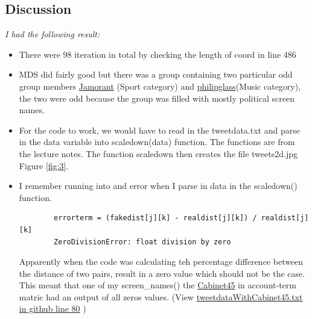 \documentclass[12pt]{article}
\begin{document}
\subsection*{Discussion}
\emph{I had the following result:}
    \begin{itemize}
        \item There were 98 iteration in total by checking the length of coord in line 486
         
        \item MDS did fairly good but there was a group containing two particular odd group members \href{https://twitter.com/JaMorant?s=20}{Jamorant} (Sport category) and 
    \href{https://twitter.com/philipglass?s=20}{philipglass}(Music category), the two were odd because the group was filled with mostly political screen names.
        \item For the code to work, we would have to read in the tweetdata.txt and parse in the data variable into scaledown(data) function. The functions are from the lecture notes. The function
scaledown  then creates the file tweets2d.jpg Figure \ref{fig:3}.
        \item I remember running into and error when I parse in data in the scaledown() function.
        \begin{lstlisting}
        errorterm = (fakedist[j][k] - realdist[j][k]) / realdist[j][k]
        ZeroDivisionError: float division by zero
        \end{lstlisting}
        Apparently when the code was calculating teh percentage difference between the distance of two pairs, result in a zero value which should not be the case.
        This meant that one of my screen\_names() the \href{https://twitter.com/Cabinet45}{Cabinet45} in account-term matric had an output of all zeros values. (View \href{https://github.com/cs432-websci-spr21/hw8-cluster-aaden001/blob/master/tweetdataWithCabinet45.txt}{tweetdataWithCabinet45.txt in github line 80} )
    \end{itemize}
\end{document}
